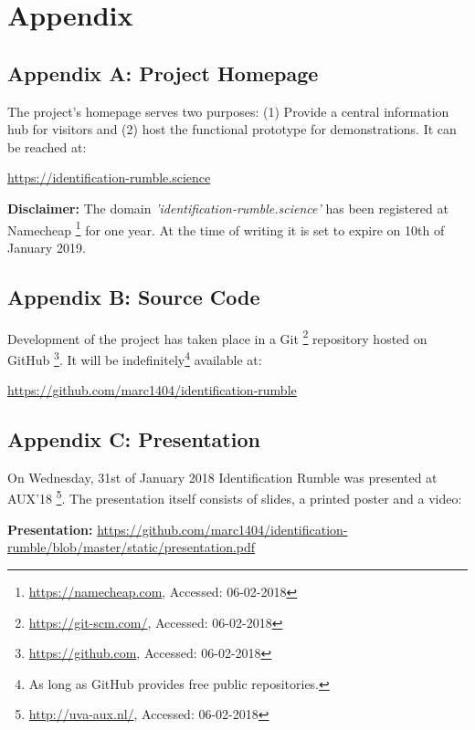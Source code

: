 
\section*{Appendix}

\subsection*{Appendix A: Project Homepage}
The project's homepage serves two purposes:
(1) Provide a central information hub for visitors
and (2) host the functional prototype for demonstrations.
It can be reached at:

\begin{flushleft}
  \url{https://identification-rumble.science}
\end{flushleft}

\textbf{Disclaimer:}
The domain \textit{'identification-rumble.science'} has been registered at Namecheap
\footnote{\url{https://namecheap.com}, Accessed: 06-02-2018}
for one year.
At the time of writing it is set to expire on 10th of January 2019.


\subsection*{Appendix B: Source Code}
Development of the project has taken place in a Git
\footnote{\url{https://git-scm.com/}, Accessed: 06-02-2018}
repository hosted on GitHub
\footnote{\url{https://github.com}, Accessed: 06-02-2018}.
It will be indefinitely\footnote{As long as GitHub provides free public repositories.} available at:

\begin{flushleft}
  \url{https://github.com/marc1404/identification-rumble}
\end{flushleft}


\subsection*{Appendix C: Presentation}
On Wednesday, 31st of January 2018 Identification Rumble was presented at AUX'18
\footnote{\url{http://uva-aux.nl/}, Accessed: 06-02-2018}.
The presentation itself consists of slides, a printed poster and a video:

\begin{flushleft}
  \textbf{Presentation:} \break
  \url{https://github.com/marc1404/identification-rumble/blob/master/static/presentation.pdf}
\end{flushleft}

